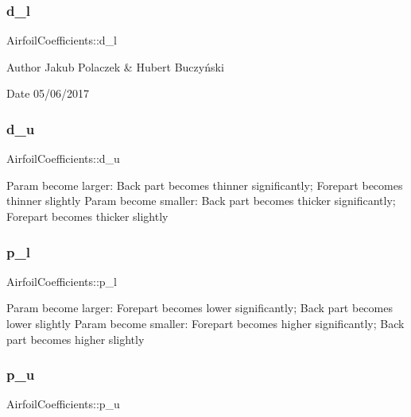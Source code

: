 \subsubsection{\texorpdfstring{d\+\_\+l}{d\_l}}
{\footnotesize\ttfamily Airfoil\+Coefficients\+::d\+\_\+l}

\begin{DoxyAuthor}{Author}
Jakub Polaczek \& Hubert Buczyński 
\end{DoxyAuthor}
\begin{DoxyDate}{Date}
05/06/2017 
\end{DoxyDate}
\mbox{\label{struct_airfoil_coefficients_ac294ea7a2fc38be4f61680e0e30290a1}} 
\subsubsection{\texorpdfstring{d\+\_\+u}{d\_u}}
{\footnotesize\ttfamily Airfoil\+Coefficients\+::d\+\_\+u}

Param become larger\+: Back part becomes thinner significantly; Forepart becomes thinner slightly Param become smaller\+: Back part becomes thicker significantly; Forepart becomes thicker slightly \mbox{\label{struct_airfoil_coefficients_a1b195a3d499c8c050ccb05faeba65c9f}} 
\subsubsection{\texorpdfstring{p\+\_\+l}{p\_l}}
{\footnotesize\ttfamily Airfoil\+Coefficients\+::p\+\_\+l}

Param become larger\+: Forepart becomes lower significantly; Back part becomes lower slightly Param become smaller\+: Forepart becomes higher significantly; Back part becomes higher slightly \mbox{\label{struct_airfoil_coefficients_a206b443b0e4e9ab91ec2d4f6570f687d}} 
\subsubsection{\texorpdfstring{p\+\_\+u}{p\_u}}
{\footnotesize\ttfamily Airfoil\+Coefficients\+::p\+\_\+u}

